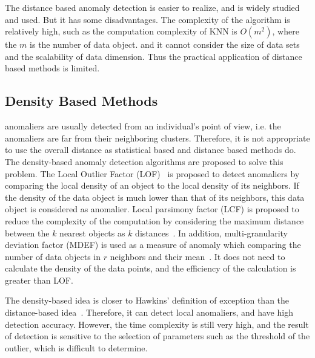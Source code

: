 The distance based anomaly detection
is easier to realize,
and is widely studied and used.
But it has some disadvantages.
The complexity of the algorithm is relatively high,
such as the computation complexity of KNN is $O(m^2)$,
where the $m$ is the number of data object.
and it cannot consider the size of
data sets and the scalability of data dimension.
Thus the practical application of distance based methods is limited.

\subsection{Density Based Methods}

anomaliers are usually detected from an individual's point of view,
i.e.
the anomaliers are far from their neighboring clusters.
Therefore,
it is not appropriate to use the overall distance as statistical based and distance based methods do.
The density-based anomaly detection algorithms are proposed to solve this problem.
The Local Outlier Factor (LOF)~\cite{breunig2000lof}
is proposed to detect anomaliers by comparing the local density of an object to the local density of its neighbors.
If the density of the data object is
much lower than that of its neighbors,
this data object is considered as anomalier.
Local parsimony factor (LCF) is proposed to
reduce the complexity of the
computation by considering the maximum distance between
the $k$ nearest objects as $k$ distances~\cite{agyemang2004algorithm}.
In addition,
multi-granularity deviation factor (MDEF) is used as a measure of anomaly which comparing the number of data objects in $r$ neighbors and their mean~\cite{papadimitriou2003loci}.
It does not need to calculate the density of the data points,
and the efficiency of the calculation is greater than LOF.

The density-based idea is closer to Hawkins' definition of
exception than the distance-based idea~\cite{hawkins1980identification}.
Therefore,
it can detect local anomaliers,
and have high detection accuracy.
However,
the time complexity is still very high,
and the result of detection is sensitive to
the selection of parameters such as the threshold of the outlier,
which is difficult to determine.


